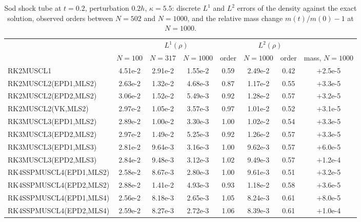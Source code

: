\documentclass[11pt,a4paper]{article}
\numberwithin{equation}{section}
\begin{document}
\begin{table}[!htbp]
\centering
\caption{Sod shock tube at $t=0.2$, perturbation $0.2h$, $\kappa=5.5$: discrete $L^1$ and $L^2$ errors of the density against the exact solution, observed orders between $N=502$ and $N=1000$, and the relative mass change $m(t)/m(0)-1$ at $N=1000$.}\label{tab:sod}
\footnotesize
\setlength{\tabcolsep}{4pt}
\begin{tabular}{lccccccc}
\toprule
& \multicolumn{4}{c}{$L^1(\rho)$} & \multicolumn{2}{c}{$L^2(\rho)$} & \\
\cmidrule(lr){2-5}\cmidrule(lr){6-7}
& $N=100$ & $N=317$ & $N=1000$ & order & $N=1000$ & order & mass, $N=1000$\\
\midrule
RK2MUSCL1 & 4.51e-2 & 2.91e-2 & 1.55e-2 & 0.59 & 2.49e-2 & 0.42 & $+$2.5e-5\\
RK2MUSCL2(EPD1,MLS2) & 2.63e-2 & 1.32e-2 & 4.68e-3 & 0.87 & 1.17e-2 & 0.55 & $+$3.3e-5\\
RK2MUSCL2(EPD2,MLS2) & 3.06e-2 & 1.52e-2 & 5.49e-3 & 0.92 & 1.28e-2 & 0.57 & $+$3.2e-5\\
RK2MUSCL2(VK,MLS2) & 2.97e-2 & 1.05e-2 & 3.57e-3 & 0.97 & 1.01e-2 & 0.52 & $+$3.1e-5\\
RK3MUSCL3(EPD1,MLS2) & 2.89e-2 & 1.00e-2 & 3.30e-3 & 1.00 & 1.02e-2 & 0.54 & $+$3.3e-5\\
RK3MUSCL3(EPD2,MLS2) & 2.97e-2 & 1.49e-2 & 5.25e-3 & 0.92 & 1.26e-2 & 0.57 & $+$3.3e-5\\
RK3MUSCL3(EPD1,MLS3) & 2.81e-2 & 9.64e-3 & 3.16e-3 & 1.00 & 9.62e-3 & 0.57 & $+$6.0e-5\\
RK3MUSCL3(EPD2,MLS3) & 2.84e-2 & 9.48e-3 & 3.12e-3 & 1.02 & 9.49e-3 & 0.57 & $+$1.2e-4\\
RK4SSPMUSCL4(EPD1,MLS2) & 2.58e-2 & 8.67e-3 & 2.80e-3 & 1.00 & 9.61e-3 & 0.51 & $+$3.2e-5\\
RK4SSPMUSCL4(EPD2,MLS2) & 2.88e-2 & 1.41e-2 & 4.93e-3 & 0.93 & 1.18e-2 & 0.58 & $+$3.6e-5\\
RK4SSPMUSCL4(EPD1,MLS4) & 2.56e-2 & 8.18e-3 & 2.65e-3 & 1.05 & 8.24e-3 & 0.61 & $+$8.0e-5\\
RK4SSPMUSCL4(EPD2,MLS4) & 2.59e-2 & 8.27e-3 & 2.72e-3 & 1.06 & 8.39e-3 & 0.61 & $+$1.0e-4\\
\bottomrule
\end{tabular}
\end{table}
\end{document}
